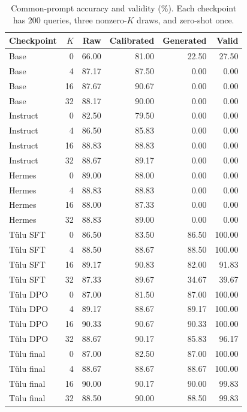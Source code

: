 \begin{table}[htbp]\centering\color{blue}\footnotesize
\caption{Common-prompt accuracy and validity (\%). Each checkpoint has 200 queries, three nonzero-$K$ draws, and zero-shot once.}
\label{stab:shared_readouts}
\begin{tabular}{lrrrrr}
\toprule
Checkpoint & $K$ & Raw & Calibrated & Generated & Valid \\
\midrule
Base & 0 & 66.00 & 81.00 & 22.50 & 27.50 \\
Base & 4 & 87.17 & 87.50 & 0.00 & 0.00 \\
Base & 16 & 87.67 & 90.67 & 0.00 & 0.00 \\
Base & 32 & 88.17 & 90.00 & 0.00 & 0.00 \\
Instruct & 0 & 82.50 & 79.50 & 0.00 & 0.00 \\
Instruct & 4 & 86.50 & 85.83 & 0.00 & 0.00 \\
Instruct & 16 & 88.83 & 88.83 & 0.00 & 0.00 \\
Instruct & 32 & 88.67 & 89.17 & 0.00 & 0.00 \\
Hermes & 0 & 89.00 & 88.00 & 0.00 & 0.00 \\
Hermes & 4 & 88.83 & 88.83 & 0.00 & 0.00 \\
Hermes & 16 & 88.00 & 87.33 & 0.00 & 0.00 \\
Hermes & 32 & 88.83 & 89.00 & 0.00 & 0.00 \\
T\"ulu SFT & 0 & 86.50 & 83.50 & 86.50 & 100.00 \\
T\"ulu SFT & 4 & 88.50 & 88.67 & 88.50 & 100.00 \\
T\"ulu SFT & 16 & 89.17 & 90.83 & 82.00 & 91.83 \\
T\"ulu SFT & 32 & 87.33 & 89.67 & 34.67 & 39.67 \\
T\"ulu DPO & 0 & 87.00 & 81.50 & 87.00 & 100.00 \\
T\"ulu DPO & 4 & 89.17 & 88.67 & 89.17 & 100.00 \\
T\"ulu DPO & 16 & 90.33 & 90.67 & 90.33 & 100.00 \\
T\"ulu DPO & 32 & 88.67 & 90.17 & 85.83 & 96.17 \\
T\"ulu final & 0 & 87.00 & 82.50 & 87.00 & 100.00 \\
T\"ulu final & 4 & 88.67 & 88.67 & 88.67 & 100.00 \\
T\"ulu final & 16 & 90.00 & 90.17 & 90.00 & 99.83 \\
T\"ulu final & 32 & 88.50 & 90.00 & 88.50 & 99.83 \\
\bottomrule\end{tabular}\end{table}
